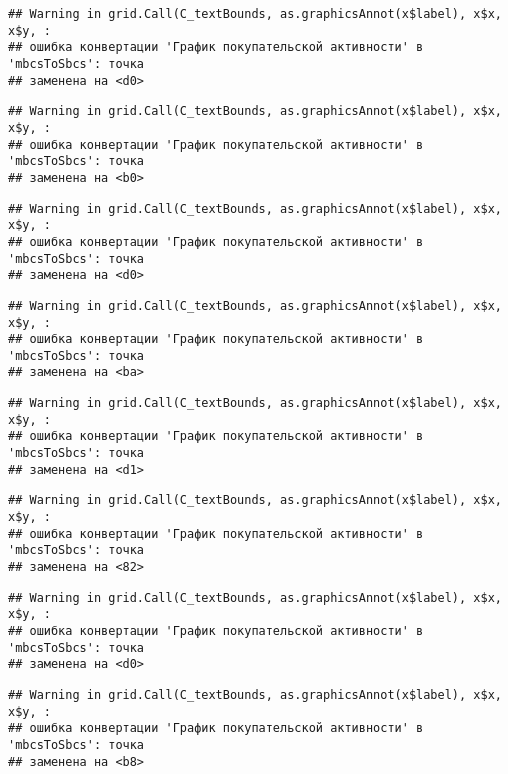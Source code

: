 \documentclass[
]{article}
\begin{document}
\begin{verbatim}
## Warning in grid.Call(C_textBounds, as.graphicsAnnot(x$label), x$x, x$y, :
## ошибка конвертации 'График покупательской активности' в 'mbcsToSbcs': точка
## заменена на <d0>
\end{verbatim}

\begin{verbatim}
## Warning in grid.Call(C_textBounds, as.graphicsAnnot(x$label), x$x, x$y, :
## ошибка конвертации 'График покупательской активности' в 'mbcsToSbcs': точка
## заменена на <b0>
\end{verbatim}

\begin{verbatim}
## Warning in grid.Call(C_textBounds, as.graphicsAnnot(x$label), x$x, x$y, :
## ошибка конвертации 'График покупательской активности' в 'mbcsToSbcs': точка
## заменена на <d0>
\end{verbatim}

\begin{verbatim}
## Warning in grid.Call(C_textBounds, as.graphicsAnnot(x$label), x$x, x$y, :
## ошибка конвертации 'График покупательской активности' в 'mbcsToSbcs': точка
## заменена на <ba>
\end{verbatim}

\begin{verbatim}
## Warning in grid.Call(C_textBounds, as.graphicsAnnot(x$label), x$x, x$y, :
## ошибка конвертации 'График покупательской активности' в 'mbcsToSbcs': точка
## заменена на <d1>
\end{verbatim}

\begin{verbatim}
## Warning in grid.Call(C_textBounds, as.graphicsAnnot(x$label), x$x, x$y, :
## ошибка конвертации 'График покупательской активности' в 'mbcsToSbcs': точка
## заменена на <82>
\end{verbatim}

\begin{verbatim}
## Warning in grid.Call(C_textBounds, as.graphicsAnnot(x$label), x$x, x$y, :
## ошибка конвертации 'График покупательской активности' в 'mbcsToSbcs': точка
## заменена на <d0>
\end{verbatim}

\begin{verbatim}
## Warning in grid.Call(C_textBounds, as.graphicsAnnot(x$label), x$x, x$y, :
## ошибка конвертации 'График покупательской активности' в 'mbcsToSbcs': точка
## заменена на <b8>
\end{verbatim}
\end{document}
